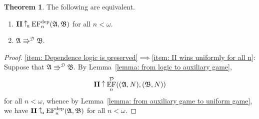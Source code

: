 \documentclass[12pt]{article}
\theoremstyle{definition}
\newtheorem{theorem}[definition]{Theorem}
\newcommand{\wins}{\mathbin{\raisebox{0.8\depth}{$\uparrow$}}}
\newcommand{\playertwo}{\mathrm{\mathbf{II}}}
\DeclareMathOperator{\EF}{EF}
\newcommand{\EFdep}{\EF^{\mathrm{dep}}}
\newcommand{\winsu}{\wins_{\!\textrm u}}
\newcommand{\A}{\mathfrak{A}}
\newcommand{\B}{\mathfrak{B}}
\newcommand{\posEquiv}{\mathbin{\Rrightarrow}}
\newcommand{\deplog}{\mathcal D}
\begin{document}
\begin{theorem}
    The following are equivalent.
    \begin{enumerate}
        \item\label{item: II wins uniformly for all n}
        $\playertwo\winsu\EFdep_n(\A,\B)$ for all $n<\omega$.
        \item\label{item: Dependence logic is preserved}
        $\A\posEquiv^\deplog\B$.
    \end{enumerate}
\end{theorem}
\begin{proof}
    \ref{item: Dependence logic is preserved}$\implies$\ref{item: II wins uniformly for all n}: Suppose that $\A\posEquiv^\deplog\B$. By Lemma~\ref{lemma: from logic to auxiliary game},
    \[
        \playertwo\wins\EF^\deplog_n((\A,N),(\B,N))
    \]
    for all $n<\omega$, whence by Lemma~\ref{lemma: from auxiliary game to uniform game}, we have $\playertwo\winsu\EFdep_n(\A,\B)$ for all $n<\omega$.


\end{proof}
\end{document}
